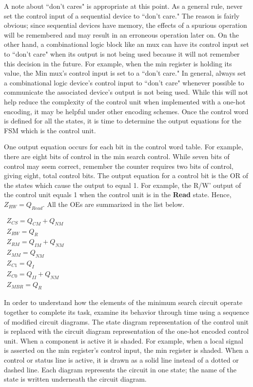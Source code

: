 A note about ``don't cares" is appropriate at this point.  As a general
rule, never set the control input of a sequential device to 
``don't care."  The reason is fairly obvious; since sequential devices 
have memory, the effects of a spurious operation will be remembered
and may result in an erroneous operation later on.  On the other hand, a
combinational logic block like an mux can have its control input set 
to ``don't care" when its output is not being used because it will not
remember this decision in the future.  For example, when the min 
register is holding its value, the Min mux's control input is set 
to a ``don't care."  In general,  always set a combinational
logic device's control input to ``don't care" whenever possible to 
communicate the associated device's output is not being used.  While
this will not help reduce the complexity of the control unit when
implemented with a one-hot encoding, it may be helpful under
other encoding schemes.  Once the control word is defined for all the
states, it is time to determine the output equations for the FSM which
is the control unit.

One output equation occurs for each bit in the control word table.
For example, there are eight bits of control in the min search control.
While seven bits of control may seem correct, remember 
the counter requires two bits of control, giving 
eight, total control bits.  The output equation for a control bit is the
OR of the states which cause the output to equal 1.  For example, the 
R/W' output of the control unit equals 1 when the control unit is in the 
\textbf{ Read} state. Hence, $Z_{RW} = Q_{Read}$.  
All the OEs are summarized in the list below.

$\begin{array}{l}
Z_{CS} = Q_{CM} + Q_{NM} \\
Z_{RW} = Q_{R} \\
Z_{RM} = Q_{IM}  + Q_{NM} \\
Z_{MM} = Q_{NM} \\
Z_{C1} = Q_{I} \\
Z_{C0} = Q_{II} + Q_{NM} \\
Z_{MBR} = Q_{R} 
\end{array}$


In order to understand how the elements of the minimum search circuit 
operate together to complete its task, examine its 
behavior through time using a sequence of modified circuit 
diagrams.  The state diagram representation of 
the control unit is replaced with the circuit diagram 
representation of the one-hot encoded control unit.  When a 
component is active it is shaded.  For example,
when a local signal is asserted on the min register's control
input, the min register is shaded. When a control
or status line is active, it is drawn as a solid line instead 
of a dotted or dashed line.  Each diagram represents the
circuit in one state; the name of the state is written 
underneath the circuit diagram.

